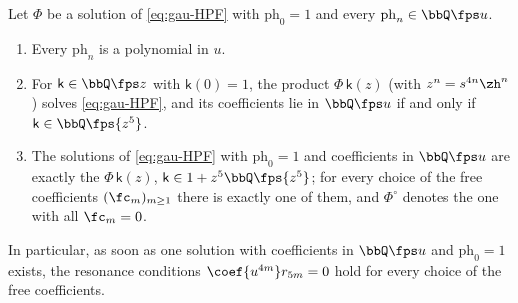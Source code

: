 \begin{lem}
\label{lem:gau-poly}
Let $\Phi$ be a solution of \eqref{eq:gau-HPF} with $\mathrm{ph}_0=1$ and every $\mathrm{ph}_n\in\bbQ\fps u$.
\begin{enumerate}
\item Every $\mathrm{ph}_n$ is a polynomial in $u$.
\item For $\mathsf k\in\bbQ\fps z$ with $\mathsf k(0)=1$, the product $\Phi\,\mathsf k(z)$ (with $z^n=s^{4n}\zh^n$) solves \eqref{eq:gau-HPF}, and its coefficients lie in $\bbQ\fps u$ if and only if $\mathsf k\in\bbQ\fps{z^5}$.
\item The solutions of \eqref{eq:gau-HPF} with $\mathrm{ph}_0=1$ and coefficients in $\bbQ\fps u$ are exactly the $\Phi\,\mathsf k(z)$, $\mathsf k\in1+z^5\bbQ\fps{z^5}$; for every choice of the free coefficients $(\fc_m)_{m\geq1}$ there is exactly one of them, and $\Phi^\circ$ denotes the one with all $\fc_m=0$.
\end{enumerate}
In particular, as soon as one solution with coefficients in $\bbQ\fps u$ and $\mathrm{ph}_0=1$ exists, the resonance conditions $\coef{u^{4m}}r_{5m}=0$ hold for every choice of the free coefficients.
\end{lem}

